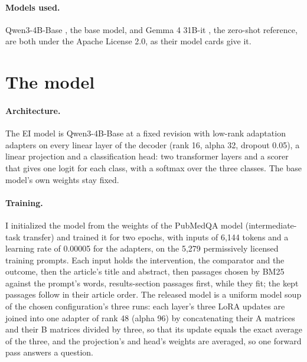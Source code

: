 \documentclass[11pt,letterpaper]{article}
\begin{document}
\paragraph{Models used.} Qwen3-4B-Base \citep{qwen3}, the base model, and Gemma 4 31B-it \citep{gemma4}, the zero-shot reference, are both under the Apache License 2.0, as their model cards give it.

\section{The model}
\label{sec:model}

\paragraph{Architecture.} The EI model is Qwen3-4B-Base at a fixed revision with low-rank adaptation \citep[LoRA;][]{hu2022} adapters on every linear layer of the decoder (rank 16, alpha 32, dropout 0.05), a linear projection and a classification head: two transformer layers and a scorer that gives one logit for each class, with a softmax over the three classes. The base model's own weights stay fixed.

\paragraph{Training.} I initialized the model from the weights of the PubMedQA model (intermediate-task transfer) and trained it for two epochs, with inputs of 6,144 tokens and a learning rate of 0.00005 for the adapters, on the 5,279 permissively licensed training prompts. Each input holds the intervention, the comparator and the outcome, then the article's title and abstract, then passages chosen by BM25 against the prompt's words, results-section passages first, while they fit; the kept passages follow in their article order. The released model is a uniform model soup \citep{wortsman2022} of the chosen configuration's three runs: each layer's three LoRA updates are joined into one adapter of rank 48 (alpha 96) by concatenating their A matrices and their B matrices divided by three, so that its update equals the exact average of the three, and the projection's and head's weights are averaged, so one forward pass answers a question.
\end{document}
